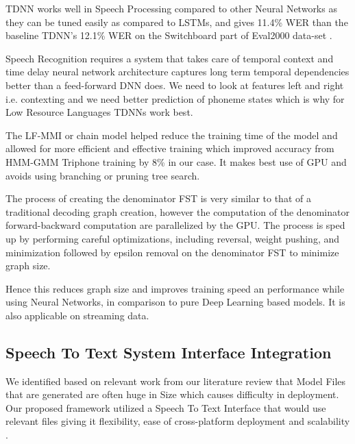 TDNN works well in Speech Processing compared to other Neural Networks as they can be tuned easily as compared to LSTMs, and gives 11.4\% WER than the baseline TDNN's 12.1\% WER on the Switchboard \cite{godfrey_switchboard_1992} part of Eval2000 data-set \cite{daniel_povey_kaldi_nodate}. 

Speech Recognition requires a system that takes care of temporal context and time delay neural network architecture captures long term temporal dependencies better than a feed-forward DNN does. We need to look at features left and right i.e. contexting and we need better prediction of phoneme states which is why for Low Resource Languages TDNNs work best. 

The LF-MMI or chain model helped reduce the training time of the model and allowed for more efficient and effective training which improved accuracy from HMM-GMM Triphone training by 8\% in our case. It makes best use of GPU and avoids using branching or pruning tree search. 

The process of creating the denominator FST is very similar to that of a traditional decoding graph creation, however the computation of the denominator forward-backward computation are parallelized by the GPU. The process is sped up by performing careful optimizations, including reversal, weight pushing, and minimization followed by epsilon removal on the denominator FST to minimize graph size.

Hence this reduces graph size and improves training speed an performance while using Neural Networks, in comparison to pure Deep Learning based models. It is also applicable on streaming data.


\subsection{Speech To Text System Interface Integration}
We identified based on relevant work from our literature review that Model Files that are generated are often huge in Size which causes difficulty in deployment. Our proposed framework utilized a Speech To Text Interface that would use relevant files giving it flexibility, ease of cross-platform deployment and scalability \cite{alphacep_vosk_2022}.

